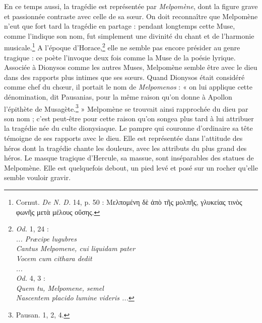 \documentclass[a4paper, 11pt, oneside, polutonikogreek, french]{article}
\begin{document}
En ce temps aussi, la tragédie est représentée par \emph{Melpomène}, dont la figure grave et passionnée contraste avec celle de sa sœur. On doit reconnaître que Melpomène n'eut que fort tard la tragédie en partage : pendant longtemps cette Muse, comme l'indique son nom, fut simplement une divinité du chant et de l'harmonie musicale.\footnote{Cornut. \emph{De N. D.} 14, p. 50 : Μελπομένη δὲ ἀπὸ τῆς μολπῆς, γλυκείας τινὸς φωνῆς μετὰ μέλους οὔσης.} A l'époque d'Horace,\footnote{\emph{Od.} 1, 24 :\\\hspace*{10mm}\emph{... Præcipe lugubres}\\\hspace*{10mm}\emph{Cantus Melpomene, cui liquidam pater}\\\hspace*{10mm}\emph{Vocem cum cithara dedit}\\\hspace*{10mm}\emph{...}\\\hspace*{5mm}\emph{Od.} 4, 3 :\\\hspace*{10mm}\emph{Quem tu, Melpomene, semel}\\\hspace*{10mm}\emph{Nascentem placido lumine videris ...}} elle ne semble pas encore présider au genre tragique : ce poète l'invoque deux fois comme la Muse de la poésie lyrique. Associée à Dionysos comme les autres Muses, Melpomène semble être avec le dieu dans des rapports plus intimes que ses sœurs. Quand Dionysos était considéré comme chef du chœur, il portait le nom de \emph{Melpomenos} : « on lui applique cette dénomination, dit Pausanias, pour la même raison qu'on donne à Apollon l'épithète de Musagète.\footnote{Pausan. 1, 2, 4.} » Melpomène se trouvait ainsi rapprochée du dieu par son nom ; c'est peut-être pour cette raison qu'on songea plus tard à lui attribuer la tragédie née du culte dionysiaque. Le pampre qui couronne d'ordinaire sa tête témoigne de ses rapports avec le dieu. Elle est représentée dans l'attitude des héros dont la tragédie chante les douleurs, avec les attributs du plus grand des héros. Le masque tragique d'Hercule, sa massue, sont inséparables des statues de Melpomène. Elle est quelquefois debout, un pied levé et posé sur un rocher qu'elle semble vouloir gravir.
\end{document}
